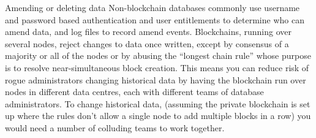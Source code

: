 Amending or deleting data
Non-blockchain databases commonly use username and password based authentication and user entitlements to determine who can amend data, and log files to record amend events.
Blockchains, running over several nodes, reject changes to data once written, except by consensus of a majority or all of the nodes or by abusing the “longest chain rule” whose purpose is to resolve near-simultaneous block creation.
This means you can reduce risk of rogue administrators changing historical data by having the blockchain run over nodes in different data centres, each with different teams of database administrators. To change historical data, (assuming the private blockchain is set up where the rules don’t allow a single node to add multiple blocks in a row) you would need a number of colluding teams to work together.